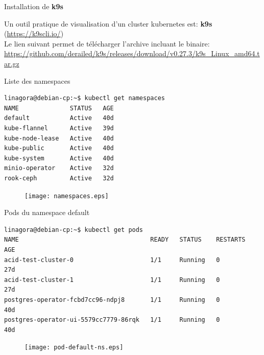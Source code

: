 
\begin{frame}[fragile]{Installation de \textbf{k9s}}

   Un outil pratique de visualisation d'un cluster kubernetes est: \textbf{k9s} (\url{https://k9scli.io/})\\
   Le lien suivant permet de télécharger l'archive incluant le binaire: \url{https://github.com/derailed/k9s/releases/download/v0.27.3/k9s_Linux_amd64.tar.gz}


\end{frame}


\begin{frame}[fragile]{Liste des namespaces}

\begin{tiny}
\begin{Verbatim}[commandchars=\\\{\}]
linagora@debian-cp:~$ kubectl get namespaces
NAME              STATUS   AGE
default           Active   40d
kube-flannel      Active   39d
kube-node-lease   Active   40d
kube-public       Active   40d
kube-system       Active   40d
minio-operator    Active   32d
rook-ceph         Active   32d
\end{Verbatim}
\end{tiny}

\begin{figure}
\begin{center}
\texttt{[image: namespaces.eps]}
\end{center}
\end{figure}

\end{frame}


\begin{frame}[fragile]{Pods du namespace default}

\begin{tiny}
\begin{Verbatim}[commandchars=\\\{\}]
linagora@debian-cp:~$ kubectl get pods          
NAME                                    READY   STATUS    RESTARTS   AGE
acid-test-cluster-0                     1/1     Running   0          27d
acid-test-cluster-1                     1/1     Running   0          27d
postgres-operator-fcbd7cc96-ndpj8       1/1     Running   0          40d
postgres-operator-ui-5579cc7779-86rqk   1/1     Running   0          40d
\end{Verbatim}
\end{tiny}

\begin{figure}
\begin{center}
\texttt{[image: pod-default-ns.eps]}
\end{center}
\end{figure}

\end{frame}

